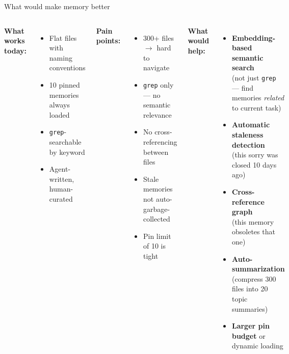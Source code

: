 \documentclass[aspectratio=169,10pt]{beamer}
\begin{document}
\begin{frame}{What would make memory better}
    \begin{columns}[T]
        \textcolor{leangreen}{\textbf{What works today:}}
        \begin{itemize}
            \item Flat files with naming conventions
            \item 10 pinned memories always loaded
            \item \texttt{grep}-searchable by keyword
            \item Agent-written, human-curated
        \end{itemize}
        \vspace{0.4em}
        \textcolor{amber}{\textbf{Pain points:}}
        \begin{itemize}
            \item 300+ files $\to$ hard to navigate
            \item \texttt{grep} only --- no semantic relevance
            \item No cross-referencing between files
            \item Stale memories not auto-garbage-collected
            \item Pin limit of 10 is tight
        \end{itemize}
        \textcolor{leangreen}{\textbf{What would help:}}
        \begin{itemize}
            \item \textbf{Embedding-based semantic search}\\{\scriptsize(not just \texttt{grep} --- find memories \emph{related} to current task)}
            \item \textbf{Automatic staleness detection}\\{\scriptsize(this sorry was closed 10 days ago)}
            \item \textbf{Cross-reference graph}\\{\scriptsize(this memory obsoletes that one)}
            \item \textbf{Auto-summarization}\\{\scriptsize(compress 300 files into 20 topic summaries)}
            \item \textbf{Larger pin budget} or dynamic loading
        \end{itemize}
    \end{columns}
\end{frame}
\end{document}
